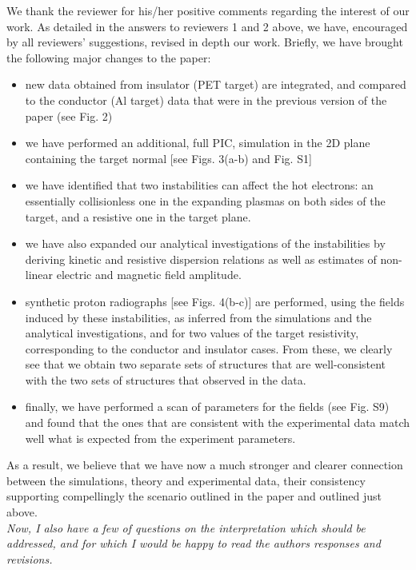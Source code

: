 \documentclass[aps,showpacs,superscriptaddress]{revtex4}%
\begin{document}
We thank the reviewer for his/her positive comments regarding the interest of our work. As detailed in the answers to reviewers 1 and 2 above, we have, encouraged by all reviewers’ suggestions, revised in depth our work.
Briefly, we have brought the following major changes to the paper:
\begin{itemize}
    \item new data obtained from insulator (PET target) are integrated, and compared to the conductor (Al target) data that were in the previous version of the paper (see Fig. 2)
    \item we have performed an additional, full PIC, simulation in the 2D plane containing the target normal [see Figs. 3(a-b) and Fig. S1]
    \item we have identified that two instabilities can affect the hot electrons: an essentially  collisionless one in the expanding plasmas on both sides of the target, and a resistive one in the target plane. 
    \item we have also expanded our analytical investigations of the instabilities by deriving kinetic and resistive dispersion relations as well as  estimates of    non-linear electric and magnetic field amplitude.
    \item synthetic proton radiographs [see Figs. 4(b-c)] are performed, using the fields induced by these instabilities, as inferred from the simulations and the analytical investigations, and for two values of the target resistivity, corresponding to the conductor and insulator cases. From these, we clearly see that we obtain two separate sets of structures that are well-consistent with the two sets of structures that observed in the data. 
    \item finally, we have performed a scan of parameters for the fields (see Fig. S9) and found that the ones that are consistent with the experimental data match well what is expected from the experiment parameters. 
\end{itemize}

As a result, we believe that we have now a much stronger and clearer connection between the simulations, theory and experimental data, their consistency supporting compellingly the scenario outlined in the paper and outlined just above.\\


\textit{
Now, I also have a few of questions on the interpretation which should be addressed, and for which I would be happy to read the authors responses and revisions.}
\end{document}
